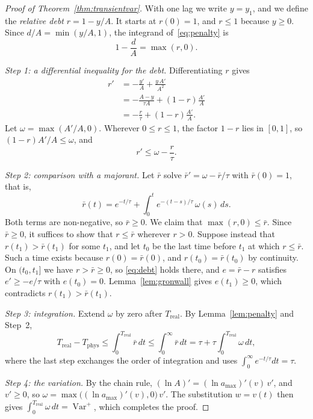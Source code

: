 \documentclass[12pt, twoside]{amsart}
\theoremstyle{definition}
\newcommand{\amax}{a_{\max}}
\begin{document}
\begin{proof}[Proof of Theorem~\ref{thm:transientvar}]
With one lag we write $y=y_1$, and we define the \emph{relative debt} $r=1-y/A$. It starts at
$r(0)=1$, and $r\le1$ because $y\ge0$. Since $d/A=\min(y/A,1)$, the integrand of~\eqref{eq:penalty}
is
\[
1-\frac dA=\max(r,0).
\]

\emph{Step 1: a differential inequality for the debt.} Differentiating $r$ gives
\begin{align*}
r'&=-\frac{y'}{A}+\frac{y\,A'}{A^2}\\
&=-\frac{A-y}{\tau A}+(1-r)\frac{A'}{A}\\
&=-\frac r\tau+(1-r)\frac{A'}{A}.
\end{align*}
Let $\omega=\max(A'/A,0)$. Wherever $0\le r\le1$, the factor $1-r$ lies in $[0,1]$, so
$(1-r)A'/A\le\omega$, and
\begin{equation}\label{eq:debt}
r'\le\omega-\frac r\tau .
\end{equation}

\emph{Step 2: comparison with a majorant.} Let $\bar r$ solve $\bar r'=\omega-\bar r/\tau$ with
$\bar r(0)=1$, that is,
\[
\bar r(t)=e^{-t/\tau}+\int_0^te^{-(t-s)/\tau}\,\omega(s)\,ds .
\]
Both terms are non-negative, so $\bar r\ge0$. We claim that $\max(r,0)\le\bar r$. Since $\bar r\ge0$, it
suffices to show that $r\le\bar r$ wherever $r>0$. Suppose instead that $r(t_1)>\bar r(t_1)$ for some
$t_1$, and let $t_0$ be the last time before $t_1$ at which $r\le\bar r$. Such a time exists because
$r(0)=\bar r(0)$, and $r(t_0)=\bar r(t_0)$ by continuity. On $(t_0,t_1]$ we have $r>\bar r\ge0$, so
\eqref{eq:debt} holds there, and $e=\bar r-r$ satisfies $e'\ge-e/\tau$ with $e(t_0)=0$.
Lemma~\ref{lem:gronwall} gives $e(t_1)\ge0$, which contradicts $r(t_1)>\bar r(t_1)$.

\emph{Step 3: integration.} Extend $\omega$ by zero after $T_{\mathrm{real}}$. By
Lemma~\ref{lem:penalty} and Step~2,
\[
T_{\mathrm{real}}-T_{\mathrm{phys}}\le\int_0^{T_{\mathrm{real}}}\bar r\,dt\le\int_0^\infty\bar r\,dt
=\tau+\tau\int_0^{T_{\mathrm{real}}}\omega\,dt,
\]
where the last step exchanges the order of integration and uses $\int_0^\infty e^{-t/\tau}dt=\tau$.

\emph{Step 4: the variation.} By the chain rule, $(\ln A)'=(\ln\amax)'(v)\,v'$, and $v'\ge0$, so
$\omega=\max\big((\ln\amax)'(v),0\big)\,v'$. The substitution $w=v(t)$ then gives
$\int_0^{T_{\mathrm{real}}}\omega\,dt=\operatorname{Var}^+$, which completes the proof.
\end{proof}
\end{document}

